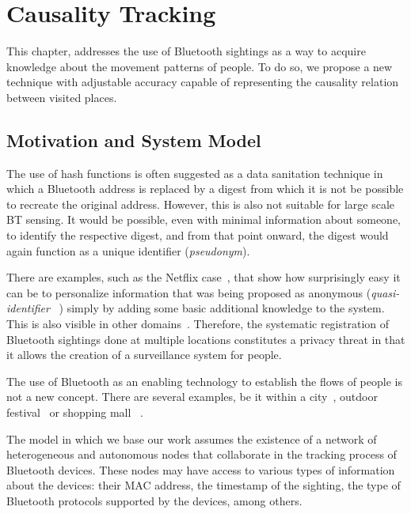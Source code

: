 \chapter{Causality Tracking}
\label{cha:causality-tracking}
This chapter, addresses the use of Bluetooth sightings as a way to
acquire knowledge about the movement patterns of people. To do so, we
propose a new technique with adjustable accuracy capable of
representing the causality relation between visited places.

\section{Motivation and System Model}
\label{sec:ct-motivation}

The use of hash functions is often suggested as a data sanitation
technique in which a Bluetooth address is replaced by a digest from
which it is not be possible to recreate the original address. However,
this is also not suitable for large scale BT sensing. It would be
possible, even with minimal information about someone, to identify the
respective digest, and from that point onward, the digest would again
function as a unique identifier (\emph{pseudonym}).

There are examples, such as the Netflix
case~\cite{DBLP:journals/corr/abs-cs-0610105}, that show how
surprisingly easy it can be to personalize information that was being
proposed as anonymous (\emph{quasi-identifier}
~\cite{bettini2005protecting}) simply by adding some basic additional
knowledge to the system. This is also visible in other
domains~\cite{Ohm:2010tc}. Therefore, the systematic registration of
Bluetooth sightings done at multiple locations constitutes a privacy
threat in that it allows the creation of a surveillance system for
people.

The use of Bluetooth as an enabling technology to establish the flows
of people is not a new concept. There are several examples, be it
within a city~\cite{Oneill:2006vq}, outdoor
festival~\cite{versichele2012use} or shopping mall
~\cite{millonig2008shadowing}.

The model in which we base our work assumes the existence of a network
of heterogeneous and autonomous nodes that collaborate in the
tracking process of Bluetooth devices. These nodes may have access to
various types of information about the devices: their MAC address, the
timestamp of the sighting, the type of Bluetooth protocols supported
by the devices, among others.

